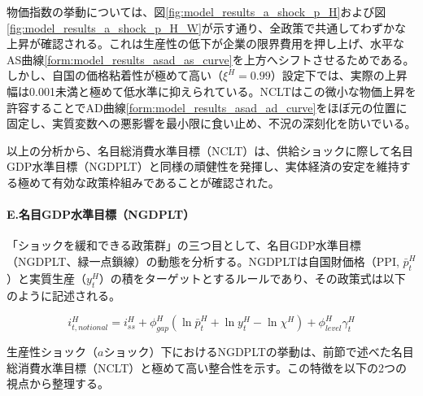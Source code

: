 物価指数の挙動については、図\ref{fig:model_results_a_shock_p_H}および図\ref{fig:model_results_a_shock_p_H_W}が示す通り、全政策で共通してわずかな上昇が確認される。これは生産性の低下が企業の限界費用を押し上げ、水平なAS曲線\eqref{form:model_results_asad_as_curve}を上方へシフトさせるためである。しかし、自国の価格粘着性が極めて高い（\(\xi^H=0.99\)）設定下では、実際の上昇幅は0.001未満と極めて低水準に抑えられている。NCLTはこの微小な物価上昇を許容することでAD曲線\eqref{form:model_results_asad_ad_curve}をほぼ元の位置に固定し、実質変数への悪影響を最小限に食い止め、不況の深刻化を防いでいる。

以上の分析から、名目総消費水準目標（NCLT）は、供給ショックに際して名目GDP水準目標（NGDPLT）と同様の頑健性を発揮し、実体経済の安定を維持する極めて有効な政策枠組みであることが確認された。

\paragraph{E.名目GDP水準目標（NGDPLT）}\label{sec:model_results_a_shock_asad_analysis_ngdplt}
「ショックを緩和できる政策群」の三つ目として、名目GDP水準目標（NGDPLT、緑一点鎖線）の動態を分析する。NGDPLTは自国財価格（PPI, \(\bar{p}^H_t\)）と実質生産（\(y_t^H\)）の積をターゲットとするルールであり、その政策式は以下のように記述される。

\begin{equation}
i_{t,notional}^H=i_{ss}^H+\phi_{gap}^H(\ln\bar{p}_t^H+\ln y_t^H-\ln\chi^H)+\phi_{level}^H\gamma_t^H
\label{form:model_results_a_shock_ngdplt_rule}
\end{equation}

生産性ショック（\(a\)ショック）下におけるNGDPLTの挙動は、前節で述べた名目総消費水準目標（NCLT）と極めて高い整合性を示す。この特徴を以下の2つの視点から整理する。

